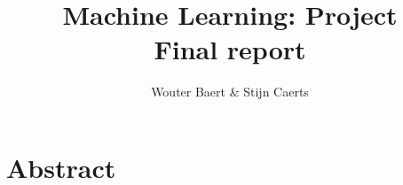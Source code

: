 \documentclass[11pt,a4paper,titlepage]{article}
\author{Wouter Baert \& Stijn Caerts}
\title{Machine Learning: Project \\ \small{Final report}}
\begin{document}
	\maketitle
	
	\section*{Abstract}
	
	\tableofcontents
	\newpage
	
	
	
	
	
	
	\newpage
	
	
\end{document}

